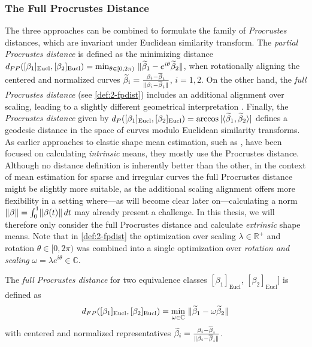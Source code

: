 \subsubsection*{The Full Procrustes Distance}
The three approaches can be combined to formulate the family of \emph{Procrustes} distances, which are invariant under Euclidean similarity transform.
The \emph{partial Procrustes distance} is defined as the minimizing distance $d_{PP}([\beta_1]_\text{Eucl}, [\beta_2]_\text{Eucl}) = \min_{\theta \in [0,2\pi)} \,\, \lVert\widetilde\beta_1 - e^{i\theta} \widetilde\beta_2\rVert$, when rotationally aligning the centered and normalized curves $\widetilde\beta_i= \frac{\beta_i - \overline\beta_i}{\lVert\beta_i - \overline\beta_i\rVert}$, $i=1,2$.
On the other hand, the \emph{full Procrustes distance} (see \cref{def:2-fpdist}) includes an additional alignment over scaling, leading to a slightly different geometrical interpretation \parencite[see][77-78]{DrydenMardia2016}.
Finally, the \emph{Procrustes distance} given by $d_P([\beta_1]_{\mathrm{Eucl}}, [\beta_2]_{\mathrm{Eucl}}) = \arccos{\lvert\langle \widetilde \beta_1, \widetilde \beta_2 \rangle\rvert}$ defines a geodesic distance in the space of curves modulo Euclidean similarity transforms.
As earlier approaches to elastic shape mean estimation, such as \cite{SrivastavaEtAl2011}, have been focused on calculating \emph{intrinsic} means, they mostly use the Procrustes distance.
Although no distance definition is inherently better than the other, in the context of mean estimation for sparse and irregular curves the full Procrustes distance might be slightly more suitable, as the additional scaling alignment offers more flexibility in a setting where---as will become clear later on---calculating a norm $\lVert\beta\rVert = \int_0^1 \lVert\beta(t)\rVert\, dt$ may already present a challenge.
In this thesis, we will therefore only consider the full Procrustes distance and calculate \emph{extrinsic} shape means.
Note that in \cref{def:2-fpdist} the optimization over scaling $\lambda \in \mathbb{R}^+$ and rotation $\theta \in [0,2\pi)$ was combined into a single optimization over \emph{rotation and scaling} $\omega = \lambda e^{i\theta} \in \mathbb{C}$.
\begin{definition}
  \label{def:2-fpdist}
  The \emph{full Procrustes distance} for two equivalence classes $[\beta_1]_\text{Eucl}$, $[\beta_2]_\text{Eucl}]$ is defined as
  \begin{equation}
    \label{eq:2-fpdist-def}
    d_{FP}([\beta_1]_\text{Eucl}, [\beta_2]_\text{Eucl}) = \min_{\omega \in \mathbb{C}} \,\, \lVert\widetilde\beta_1 - \omega \widetilde\beta_2\rVert
  \end{equation}
  with centered and normalized representatives $\widetilde\beta_i = \frac{\beta_i - \overline\beta_i}{\lVert\beta_i - \overline\beta_i\rVert}$.
\end{definition}

